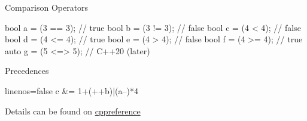 \begin{frame}[fragile]
  \begin{block}{Comparison Operators}
    \begin{cppcode*}{}
      bool a = (3 == 3);  // true
      bool b = (3 != 3);  // false
      bool c = (4 <  4);  // false
      bool d = (4 <= 4);  // true
      bool e = (4 >  4);  // false
      bool f = (4 >= 4);  // true
      auto g = (5 <=> 5); // C++20 (later)
    \end{cppcode*}
  \end{block}
  \pause
  \begin{block}{Precedences }
    \begin{cppcode*}{linenos=false}
      c &= 1+(++b)|(a--)*4%
    \end{cppcode*}
    Details can be found on {\color{blue!50!white} \href{https://en.cppreference.com/w/cpp/language/operator_precedence}{cppreference}}
  \end{block}
\end{frame}
